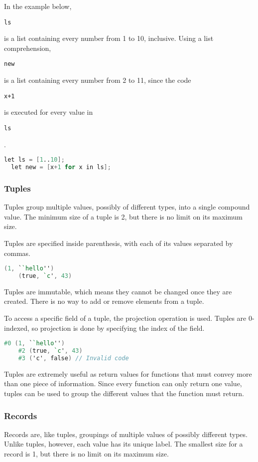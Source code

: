 \documentclass{article}
\def\code#1{\begin{footnotesize}\texttt{#1}\end{footnotesize}}
\begin{document}
In the example below, \code{ls} is a list containing every number from 1 to 10, inclusive.
Using a list comprehension, \code{new} is a list containing every number from 2 to 11, since the code \code{x+1} is executed for every value in \code{ls}.

\begin{lstlisting}[language=V]
  let ls = [1..10];
  let new = [x+1 for x in ls];
\end{lstlisting}



\subsubsection{Tuples}

Tuples group multiple values, possibly of different types, into a single compound value.
The minimum size of a tuple is 2, but there is no limit on its maximum size.

Tuples are specified inside parenthesis, with each of its values separated by commas.

\begin{lstlisting}[language=V]
    (1, ``hello'')
    (true, `c', 43)
\end{lstlisting}

Tuples are immutable, which means they cannot be changed once they are created.
There is no way to add or remove elements from a tuple.

To access a specific field of a tuple, the projection operation is used.
Tuples are 0-indexed, so projection is done by specifying the index of the field.

\begin{lstlisting}[language=V]
    #0 (1, ``hello'')
    #2 (true, `c', 43)
    #3 ('c', false) // Invalid code
\end{lstlisting}

Tuples are extremely useful as return values for functions that must convey more than one piece of information.
Since every function can only return one value, tuples can be used to group the different values that the function must return.

\subsubsection{Records}

Records are, like tuples, groupings of multiple values of possibly different types.
Unlike tuples, however, each value has its unique label.
The smallest size for a record is 1, but there is no limit on its maximum size.
\end{document}
